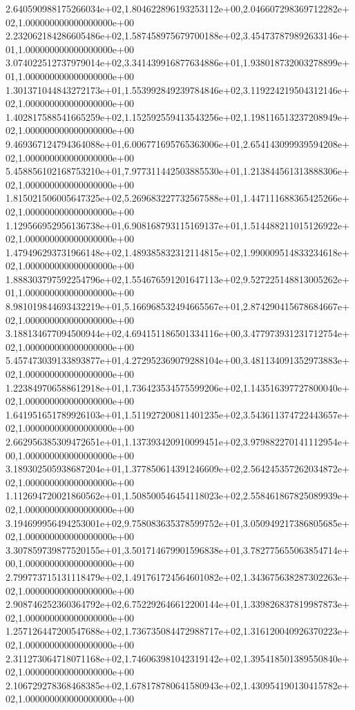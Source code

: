 2.640590988175266034e+02,1.804622896193253112e+00,2.046607298369712282e+02,1.000000000000000000e+00
2.232062184286605486e+02,1.587458975679700188e+02,3.454737879892633146e+01,1.000000000000000000e+00
3.074022512737979014e+02,3.341439916877634886e+01,1.938018732003278899e+01,1.000000000000000000e+00
1.301371044843272173e+01,1.553992849239784846e+02,3.119224219504312146e+02,1.000000000000000000e+00
1.402817588541665259e+02,1.152592559413543256e+02,1.198116513237208949e+02,1.000000000000000000e+00
9.469367124794364088e+01,6.006771695765363006e+01,2.654143099939594208e+02,1.000000000000000000e+00
5.458856102168753210e+01,7.977311442503885530e+01,1.213844561313888306e+02,1.000000000000000000e+00
1.815021506005647325e+02,5.269683227732567588e+01,1.447111688365425266e+02,1.000000000000000000e+00
1.129566952956136738e+01,6.908168793115169137e+01,1.514488211015126922e+02,1.000000000000000000e+00
1.479496293731966148e+02,1.489385832312114815e+02,1.990009514833234618e+02,1.000000000000000000e+00
1.888303797592254796e+02,1.554676591201647113e+02,9.527225148813005262e+01,1.000000000000000000e+00
8.981019844693432219e+01,5.166968532494665567e+01,2.874290415678684667e+02,1.000000000000000000e+00
3.188134677094500944e+02,4.694151186501334116e+00,3.477973931231712754e+02,1.000000000000000000e+00
5.457473039133893877e+01,4.272952369079288104e+00,3.481134091352973883e+02,1.000000000000000000e+00
1.223849706588612918e+01,1.736423534575599206e+02,1.143516397727800040e+02,1.000000000000000000e+00
1.641951651789926103e+01,1.511927200811401235e+02,3.543611374722443657e+02,1.000000000000000000e+00
2.662956385309472651e+01,1.137393420910099451e+02,3.979882270141112954e+00,1.000000000000000000e+00
3.189302505938687204e+01,1.377850614391246609e+02,2.564245357262034872e+02,1.000000000000000000e+00
1.112694720021860562e+01,1.508500546454118023e+02,2.558461867825089939e+02,1.000000000000000000e+00
3.194699956494253001e+02,9.758083635378599752e+01,3.050949217386805685e+02,1.000000000000000000e+00
3.307859739877520155e+01,3.501714679901596838e+01,3.782775655063854714e+00,1.000000000000000000e+00
2.799773715131118479e+02,1.491761724564601082e+02,1.343675638287302263e+02,1.000000000000000000e+00
2.908746252360364792e+02,6.752292646612200144e+01,1.339826837819987873e+02,1.000000000000000000e+00
1.257126447200547688e+02,1.736735084472988717e+02,1.316120040926370223e+02,1.000000000000000000e+00
2.311273064718071168e+02,1.746063981042319142e+02,1.395418501389550840e+02,1.000000000000000000e+00
2.106729278368468385e+02,1.678178780641580943e+02,1.430954190130415782e+02,1.000000000000000000e+00
